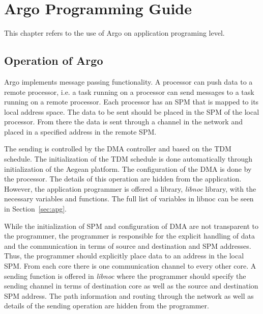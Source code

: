 \documentclass[a4paper,fontsize=10pt,twoside,DIV15,BCOR12mm,headinclude=true,footinclude=false,pagesize,bibtotoc]{scrbook}
\begin{document}


\chapter{Argo Programming Guide}
\label{chap:program}

This chapter refers to the use of Argo on application programing level.

\section{Operation of Argo}
\label{sec:oper}

Argo implements message passing functionality. A processor can push data 
to a remote processor, i.e. a task running on a processor
can send messages to a task running on a remote processor.
Each processor has an SPM that is mapped to its local address space.
The data to be sent should be placed in the SPM of the local processor.
From there the data is sent through a channel in the network and placed in a 
specified address in the remote SPM. 

The sending is controlled by the DMA controller and based on the TDM schedule.
The initialization of the TDM schedule is done automatically through initialization 
of the Aegean platform. The configuration of the DMA is done by the processor.
The details of this operation are hidden from the application. However,
the application programmer is offered a library, \textit{libnoc} library,
with the necessary variables and functions. The full list of variables in libnoc 
can be seen in Section~\ref{sec:apg}.

While the initialization of SPM and configuration of DMA are not transparent to the programmer,
the programmer is responsible for the explicit handling of data and the communication in terms of
source and destination and SPM addresses. 
Thus, the programmer should explicitly place data to an address in the local SPM. 
From each core there is one communication channel to every other core.
A sending function is offered in \textit{libnoc} where the programmer should specify 
the sending channel in terms of destination core as well as the source and destination SPM address. 
The path information and routing through the network as well as details of the sending operation 
are hidden from the programmer.
\end{document}
